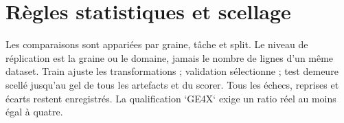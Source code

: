 \documentclass[11pt,a4paper]{article}
\begin{document}
\section{Règles statistiques et scellage}
Les comparaisons sont appariées par graine, tâche et split. Le niveau de réplication est la graine ou le domaine, jamais le nombre de lignes d'un même dataset. Train ajuste les transformations ; validation sélectionne ; test demeure scellé jusqu'au gel de tous les artefacts et du scorer. Tous les échecs, reprises et écarts restent enregistrés. La qualification `GE4X` exige un ratio réel au moins égal à quatre.
\end{document}
